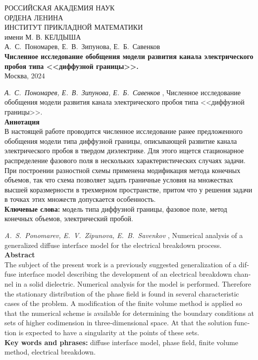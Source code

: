 \documentclass[a4paper,12pt]{article}
\theoremstyle{plain}
\theoremstyle{remark}
\newcommand{\PreprintTitle}{
	Численное исследование обобщения модели развития канала электрического пробоя типа <<диффузной границы>>.
}
\newcommand{\PreprintTitleEnglish}{
	Numerical analysis of a generalized diffuse interface model for the electrical breakdown process.
}
\newcommand{\PreprintAuthors}{
	А.~С.~Пономарев, Е.~В.~Зипунова, Е.~Б.~Савенков
}
\newcommand{\PreprintAuthorsEnglish}{
	A.~S.~Ponomarev, E.~V.~Zipunova, E.~B.~Savenkov
}
\begin{document}
\begin{titlepage}

\begin{center}
	РОССИЙСКАЯ АКАДЕМИЯ НАУК \\
	ОРДЕНА ЛЕНИНА \\
	ИНСТИТУТ ПРИКЛАДНОЙ МАТЕМАТИКИ \\
	имени М. В. КЕЛДЫША \\

	\vspace*{60mm}
	\Large{\PreprintAuthors} \\
	\vspace*{20mm}
	\textbf{\large \PreprintTitle} \\
	\vspace*{110mm}
	\Large{Москва, 2024}
	\vspace*{-50mm}
\end{center}

\end{titlepage}

\setcounter{page}{2}

\thispagestyle{empty}

\noindent \emph{\PreprintAuthors}, \PreprintTitle \\[3mm]
\textbf{Аннотация} \\
{
	\small
	В настоящей работе проводится численное исследование ранее предложенного обобщения модели типа диффузной границы, описывающей развитие канала электрического пробоя в твердом диэлектрике. Для этого ищется стационарное распределение фазового поля в нескольких характеристических случаях задачи. При построении разностной схемы применена модификация метода конечных объемов, так что схема позволяет задать граничные условия на множествах высшей коразмерности в трехмерном пространстве, притом что у решения задачи в точках этих множеств допускается особенность. \\[3mm]
	\textbf{Ключевые слова:} модель типа диффузной границы, фазовое поле, метод конечных объемов, электрический пробой. \\[5mm]
}
\begin{otherlanguage}{english}
\emph{\PreprintAuthorsEnglish}, \PreprintTitleEnglish \\[3mm]
\textbf{Abstract} \\
{
	\small
	The subject of the present work is a previously suggested generalization of a diffuse interface model describing the development of an electrical breakdown channel in a solid dielectric. Numerical analysis for the model is performed. Therefore the stationary distribution of the phase field is found in several characteristic cases of the problem. A modification of the finite volume method is applied so that the numerical scheme is available for determining the boundary conditions at sets of higher codimension in three-dimensional space. At that the solution function is expected to have a singularity at the points of these sets. \\[3mm]
	\textbf{Key words and phrases:} diffuse interface model, phase field, finite volume method, electrical breakdown. \\[5mm]
}
\end{otherlanguage}
\end{document}
